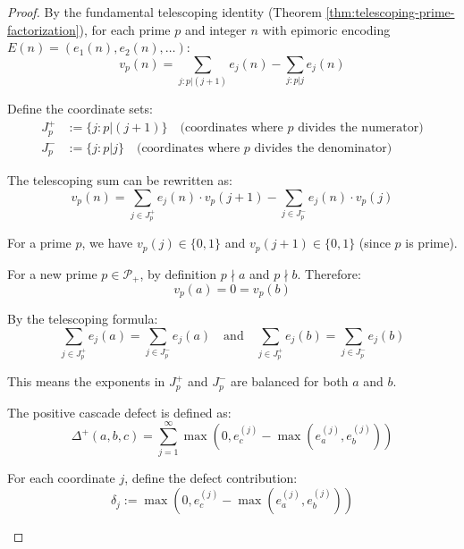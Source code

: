 \begin{proof}

By the fundamental telescoping identity (Theorem \ref{thm:telescoping-prime-factorization}), for each prime $p$ and integer $n$ with epimoric encoding $E(n) = (e_1(n), e_2(n), \ldots)$:
\begin{equation}
\label{eq:telescoping-general}
v_p(n) = \sum_{j: p|(j+1)} e_j(n) - \sum_{j: p|j} e_j(n)
\end{equation}

Define the coordinate sets:
\begin{align}
J_p^+ &:= \{j : p | (j+1)\} \quad \text{(coordinates where $p$ divides the numerator)} \\
J_p^- &:= \{j : p | j\} \quad \text{(coordinates where $p$ divides the denominator)}
\end{align}

The telescoping sum can be rewritten as:
\begin{equation}
v_p(n) = \sum_{j \in J_p^+} e_j(n) \cdot v_p(j+1) - \sum_{j \in J_p^-} e_j(n) \cdot v_p(j)
\end{equation}

For a prime $p$, we have $v_p(j) \in \{0, 1\}$ and $v_p(j+1) \in \{0, 1\}$ (since $p$ is prime).

For a new prime $p \in \mathcal{P}_+$, by definition $p \nmid a$ and $p \nmid b$. Therefore:
\begin{equation}
v_p(a) = 0 = v_p(b)
\end{equation}

By the telescoping formula:
\begin{equation}
\sum_{j \in J_p^+} e_j(a) = \sum_{j \in J_p^-} e_j(a) \quad \text{and} \quad \sum_{j \in J_p^+} e_j(b) = \sum_{j \in J_p^-} e_j(b)
\end{equation}

This means the exponents in $J_p^+$ and $J_p^-$ are balanced for both $a$ and $b$.

The positive cascade defect is defined as:
\begin{equation}
\Delta^+(a,b,c) = \sum_{j=1}^{\infty} \max(0, e_c^{(j)} - \max(e_a^{(j)}, e_b^{(j)}))
\end{equation}

\begin{lemma}
\label{lem:defect-attribution}

For each coordinate $j$, define the defect contribution:
\begin{equation}
\delta_j := \max(0, e_c^{(j)} - \max(e_a^{(j)}, e_b^{(j)}))
\end{equation}


\end{lemma}
\end{proof}
